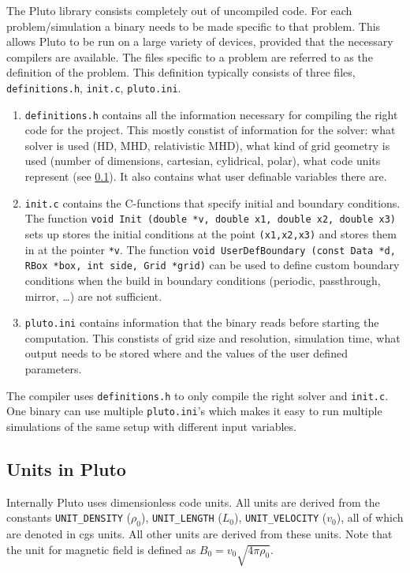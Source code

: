 \documentclass[a4paper]{article}
\numberwithin{figure}{section}
\numberwithin{equation}{section}
\begin{document}
The Pluto library consists completely out of uncompiled code. For each problem/simulation a binary needs to be made specific to that problem. This allows Pluto to be run on a large variety of devices, provided that the necessary compilers are available.
The files specific to a problem are referred to as the definition of the problem. 
This definition typically consists of three files, \texttt{definitions.h}, \texttt{init.c}, \texttt{pluto.ini}.
\begin{enumerate}
	\item \texttt{definitions.h} contains all the information necessary for compiling the right code for the project. This mostly constist of information for the solver: what solver is used (HD, MHD, relativistic MHD), what kind of grid geometry is used (number of dimensions, cartesian, cylidrical, polar), what code units represent (see \cref{sec:units_in_pluto}). It also contains what user definable variables there are.
	\item \texttt{init.c} contains the C-functions that specify initial and boundary conditions. The function \texttt{void Init (double *v, double x1, double x2, double x3)} sets up stores the initial conditions at the point \texttt{(x1,x2,x3)} and stores them in at the pointer \texttt{*v}.
		The function \texttt{void UserDefBoundary (const Data *d, RBox *box, int side, Grid *grid)} can be used to define custom boundary conditions when the build in boundary conditions (periodic, passthrough, mirror, \ldots) are not sufficient.
	\item \texttt{pluto.ini} contains information that the binary reads before starting the computation. This constists of grid size and resolution, simulation time, what output needs to be stored where and the values of the user defined parameters.
\end{enumerate}
The compiler uses \texttt{definitions.h} to only compile the right solver and \texttt{init.c}. One binary can use multiple \texttt{pluto.ini}'s which makes it easy to run multiple simulations of the same setup with different input variables. 

\subsection{Units in Pluto} \label{sec:units_in_pluto}

Internally Pluto uses dimensionless code units. All units are derived from the constants \texttt{UNIT\_DENSITY} ($\rho_0$), \texttt{UNIT\_LENGTH} ($L_0$), \texttt{UNIT\_VELOCITY} ($v_0$), all of which are denoted in cgs units. All other units are derived from these units.  
Note that the unit for magnetic field is defined as $B_0 = v_0\sqrt{4\pi \rho_0} $.
\end{document}

